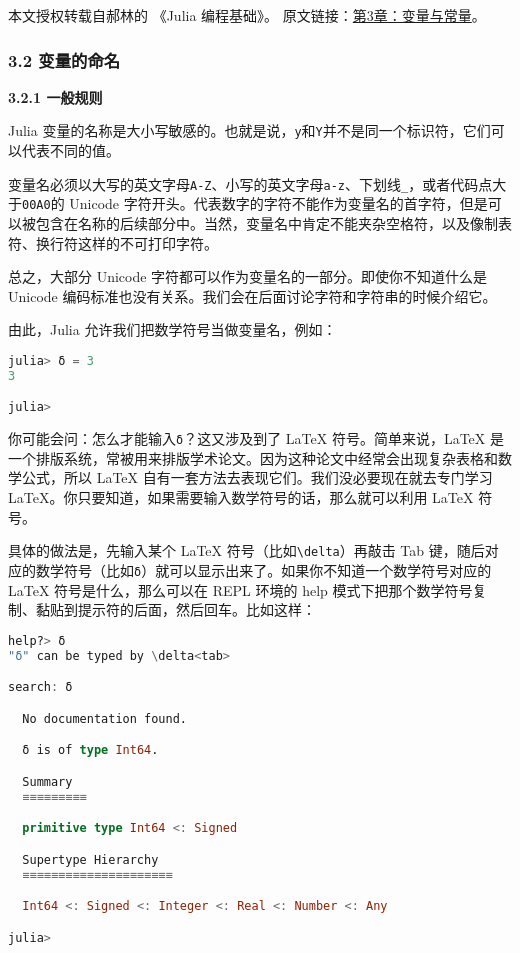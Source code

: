
本文授权转载自郝林的 《Julia 编程基础》。 原文链接：\href{https://github.com/hyper0x/JuliaBasics/blob/master/book/ch03.md}{第3章：变量与常量}。


\subsubsection{3.2 变量的命名}

\textbf{3.2.1 一般规则}

Julia 变量的名称是大小写敏感的。也就是说，\verb`y`和\verb`Y`并不是同一个标识符，它们可以代表不同的值。

变量名必须以大写的英文字母\verb`A-Z`、小写的英文字母\verb`a-z`、下划线\verb`_`，或者代码点大于\verb`00A0`的 Unicode 字符开头。代表数字的字符不能作为变量名的首字符，但是可以被包含在名称的后续部分中。当然，变量名中肯定不能夹杂空格符，以及像制表符、换行符这样的不可打印字符。

总之，大部分 Unicode 字符都可以作为变量名的一部分。即使你不知道什么是 Unicode 编码标准也没有关系。我们会在后面讨论字符和字符串的时候介绍它。

由此，Julia 允许我们把数学符号当做变量名，例如：

\begin{lstlisting}[language=julia]
julia> δ = 3
3

julia> 
\end{lstlisting}

你可能会问：怎么才能输入\verb`δ`？这又涉及到了 LaTeX 符号。简单来说，LaTeX 是一个排版系统，常被用来排版学术论文。因为这种论文中经常会出现复杂表格和数学公式，所以 LaTeX 自有一套方法去表现它们。我们没必要现在就去专门学习 LaTeX。你只要知道，如果需要输入数学符号的话，那么就可以利用 LaTeX 符号。

具体的做法是，先输入某个 LaTeX 符号（比如\verb`\delta`）再敲击 Tab 键，随后对应的数学符号（比如\verb`δ`）就可以显示出来了。如果你不知道一个数学符号对应的 LaTeX 符号是什么，那么可以在 REPL 环境的 help 模式下把那个数学符号复制、黏贴到提示符的后面，然后回车。比如这样：

\begin{lstlisting}[language=julia]
help?> δ
"δ" can be typed by \delta<tab>

search: δ

  No documentation found.

  δ is of type Int64.

  Summary
  ≡≡≡≡≡≡≡≡≡

  primitive type Int64 <: Signed

  Supertype Hierarchy
  ≡≡≡≡≡≡≡≡≡≡≡≡≡≡≡≡≡≡≡≡≡

  Int64 <: Signed <: Integer <: Real <: Number <: Any

julia> 
\end{lstlisting}

